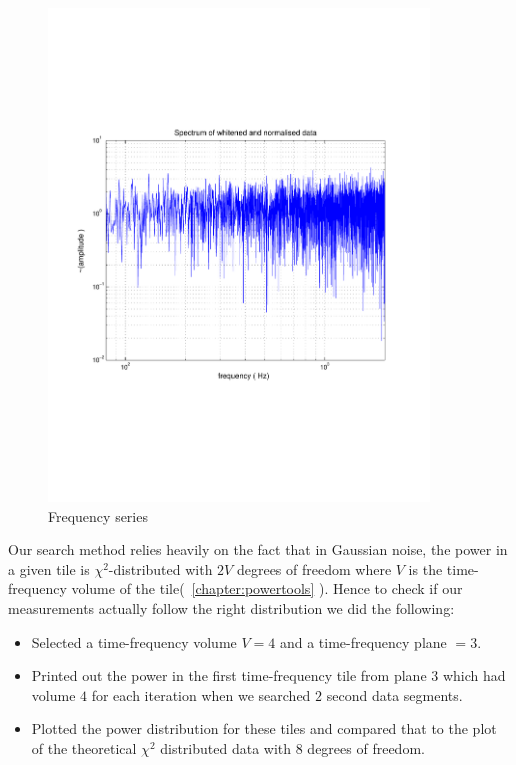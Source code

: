 \begin{figure}[h]
\begin{center}
\includegraphics[width=0.9\textwidth]{figures/freqseries_psd}
\caption{Frequency series}
\label{fig:gaussianfreqseries}
\end{center}
\end{figure}
 
Our search method relies heavily on the fact that in Gaussian noise, 
 the power in a given tile is $\chi^2$-distributed with 
$2 V$ degrees of freedom where $V$ is the time-frequency volume of the 
tile(~\ref{chapter:powertools} ).  Hence to check if our measurements 
actually follow the right distribution we did the following:
\begin{itemize}
\item Selected a time-frequency volume $V = 4$ and a time-frequency plane
      $= 3 $.
\item Printed out the power in the first time-frequency tile from 
      plane $3$ which had volume $4$ for each iteration when we searched 
      $2$ second data segments.
\item Plotted the power distribution for these tiles and compared that to the plot
      of the theoretical $\chi^2$ distributed data with $8$ degrees of freedom. 
\end{itemize}

